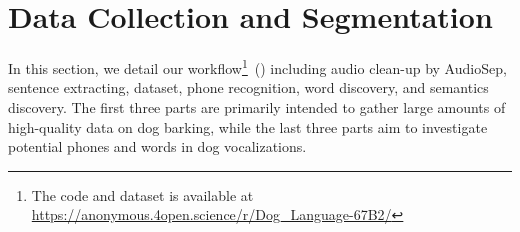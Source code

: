 \section{Data Collection and Segmentation}
\label{sec:method}

In this section, we detail our workflow\footnote{The code and dataset is available at \url{https://anonymous.4open.science/r/Dog_Language-67B2/}}~() including audio clean-up by AudioSep, sentence extracting, dataset, phone recognition, word discovery, and semantics discovery. 
The first three parts are primarily intended to gather large amounts of high-quality data on dog barking, while the last three parts aim to investigate potential phones and words in dog vocalizations.

